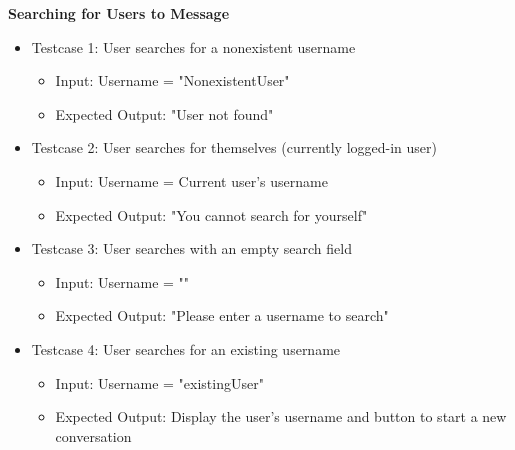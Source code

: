 \noindent
\textbf{Searching for Users to Message}
\begin{itemize}
    \item Testcase 1: User searches for a nonexistent username
    \begin{itemize}
        \item Input: Username = "NonexistentUser"
        \item Expected Output: "User not found"
    \end{itemize}

    \item Testcase 2: User searches for themselves (currently logged-in user)
    \begin{itemize}
        \item Input: Username = Current user’s username
        \item Expected Output: "You cannot search for yourself"
    \end{itemize}

    \item Testcase 3: User searches with an empty search field
    \begin{itemize}
        \item Input: Username = ""
        \item Expected Output: "Please enter a username to search"
    \end{itemize}

    \item Testcase 4: User searches for an existing username
    \begin{itemize}
        \item Input: Username = "existingUser"
        \item Expected Output: Display the user’s username and button to start a new conversation
    \end{itemize}
\end{itemize}

